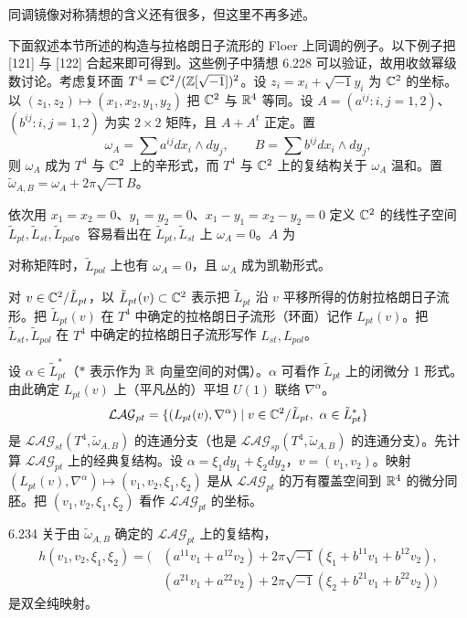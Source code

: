 同调镜像对称猜想的含义还有很多，但这里不再多述。

下面叙述本节所述的构造与拉格朗日子流形的 Floer 上同调的例子。以下例子把 [121] 与 [122] 合起来即可得到。这些例子中猜想 6.228 可以验证，故用收敛幂级数讨论。考虑复环面 $T^4=\mathbb{C}^2/(\mathbb{Z}[\sqrt{-1}])^2$。设 $z_i=x_i+\sqrt{-1}y_i$ 为 $\mathbb{C}^2$ 的坐标。以 $(z_1,z_2)\mapsto(x_1,x_2,y_1,y_2)$ 把 $\mathbb{C}^2$ 与 $\mathbb{R}^4$ 等同。设 $A=(a^{ij}:i,j=1,2)$、$(b^{ij}:i,j=1,2)$ 为实 $2\times2$ 矩阵，且 $A+A^t$ 正定。置
\[
  \omega_A=\sum a^{ij}dx_i\wedge dy_j,\qquad B=\sum b^{ij}dx_i\wedge dy_j,
\]
则 $\omega_A$ 成为 $T^4$ 与 $\mathbb{C}^2$ 上的辛形式，而 $T^4$ 与 $\mathbb{C}^2$ 上的复结构关于 $\omega_A$ 温和。置 $\tilde\omega_{A,B}=\omega_A+2\pi\sqrt{-1}B$。

依次用 $x_1=x_2=0$、$y_1=y_2=0$、$x_1-y_1=x_2-y_2=0$ 定义 $\mathbb{C}^2$ 的线性子空间 $\tilde L_{pt},\tilde L_{st},\tilde L_{pol}$。容易看出在 $\tilde L_{pt},\tilde L_{st}$ 上 $\omega_A=0$。$A$ 为

对称矩阵时，$\tilde L_{pol}$ 上也有 $\omega_A=0$，且 $\omega_A$ 成为凯勒形式。

对 $v\in\mathbb{C}^2/\tilde L_{pt}$，以 $\tilde L_{pt}(v)\subset\mathbb{C}^2$ 表示把 $\tilde L_{pt}$ 沿 $v$ 平移所得的仿射拉格朗日子流形。把 $\tilde L_{pt}(v)$ 在 $T^4$ 中确定的拉格朗日子流形（环面）记作 $L_{pt}(v)$。把 $\tilde L_{st},\tilde L_{pol}$ 在 $T^4$ 中确定的拉格朗日子流形写作 $L_{st},L_{pol}$。

设 $\alpha\in\tilde L^*_{pt}$（$*$ 表示作为 $\mathbb{R}$ 向量空间的对偶）。$\alpha$ 可看作 $\tilde L_{pt}$ 上的闭微分 1 形式。由此确定 $L_{pt}(v)$ 上（平凡丛的）平坦 $U(1)$ 联络 $\nabla^\alpha$。
\[
  \mathcal{LAG}_{pt}=\{(L_{pt}(v),\nabla^\alpha)\mid v\in\mathbb{C}^2/\tilde L_{pt},\ \alpha\in\tilde L^*_{pt}\}
\]
是 $\mathcal{LAG}_{st}(T^4,\tilde\omega_{A,B})$ 的连通分支（也是 $\mathcal{LAG}_{sp}(T^4,\tilde\omega_{A,B})$ 的连通分支）。先计算 $\mathcal{LAG}_{pt}$ 上的经典复结构。设 $\alpha=\xi_1dy_1+\xi_2dy_2$，$v=(v_1,v_2)$。映射 $(L_{pt}(v),\nabla^\alpha)\mapsto(v_1,v_2,\xi_1,\xi_2)$ 是从 $\mathcal{LAG}_{pt}$ 的万有覆盖空间到 $\mathbb{R}^4$ 的微分同胚。把 $(v_1,v_2,\xi_1,\xi_2)$ 看作 $\mathcal{LAG}_{pt}$ 的坐标。

\begin{lemma}{6.234}
  关于由 $\tilde\omega_{A,B}$ 确定的 $\mathcal{LAG}_{pt}$ 上的复结构，
  \begin{align*}
    h(v_1,v_2,\xi_1,\xi_2)=\bigl(&(a^{11}v_1+a^{12}v_2)+2\pi\sqrt{-1}(\xi_1+b^{11}v_1+b^{12}v_2),\\
    &(a^{21}v_1+a^{22}v_2)+2\pi\sqrt{-1}(\xi_2+b^{21}v_1+b^{22}v_2)\bigr)
  \end{align*}
  是双全纯映射。
\end{lemma}

